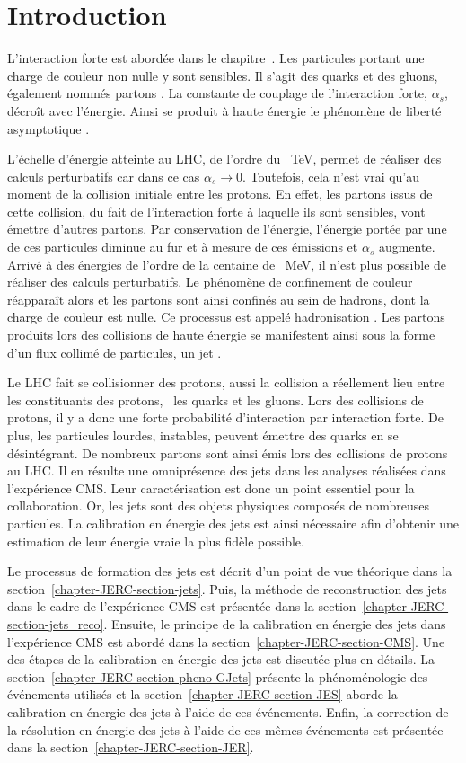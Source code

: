 \section{Introduction}\label{chapter-JERC-section-introduction}
L'interaction forte est abordée dans le chapitre~.
Les particules portant une charge de couleur non nulle y sont sensibles.
Il s'agit des quarks et des gluons, également nommés \og partons \fg.
La constante de couplage de l'interaction forte, $\alpha_s$, décroît  avec l'énergie.
Ainsi se produit à haute énergie le phénomène de \og liberté asymptotique \fg.
\par L'échelle d'énergie atteinte au LHC, de l'ordre du \SI{}{\TeV}, permet de réaliser des calculs perturbatifs car dans ce cas $\alpha_s \to 0$. Toutefois, cela n'est vrai qu'au moment de la collision initiale entre les protons.
En effet, les partons issus de cette collision, du fait de l'interaction forte à laquelle ils sont sensibles, vont émettre d'autres partons.
Par conservation de l'énergie, l'énergie portée par une de ces particules diminue au fur et à mesure de ces émissions et $\alpha_s$ augmente.
Arrivé à des énergies de l'ordre de la centaine de \SI{}{\MeV}, il n'est plus possible de réaliser des calculs perturbatifs.
Le phénomène de confinement de couleur réapparaît alors et les partons sont ainsi confinés au sein de hadrons, dont la charge de couleur est nulle.
Ce processus est appelé \og hadronisation \fg.
Les partons produits lors des collisions de haute énergie se manifestent ainsi sous la forme d'un flux collimé de particules, un \og jet \fg.
\par Le LHC fait se collisionner des protons, aussi la collision a réellement lieu entre les constituants des protons, \ie\ les quarks et les gluons.
Lors des collisions de protons, il y a donc une forte probabilité d'interaction par interaction forte.
De plus, les particules lourdes, instables, peuvent émettre des quarks en se désintégrant.
De nombreux partons sont ainsi émis lors des collisions de protons au LHC.
Il en résulte une omniprésence des jets dans les analyses réalisées dans l'expérience CMS.
Leur caractérisation est donc un point essentiel pour la collaboration.
Or, les jets sont des objets physiques composés de nombreuses particules.
La calibration en énergie des jets est ainsi nécessaire afin d'obtenir une estimation de leur énergie \og vraie \fg{} la plus fidèle possible.
\par Le processus de formation des jets est décrit d'un point de vue théorique dans la section~\ref{chapter-JERC-section-jets}.
Puis, la méthode de reconstruction des jets dans le cadre de l'expérience CMS est présentée dans la section~\ref{chapter-JERC-section-jets_reco}.
Ensuite, le principe de la calibration en énergie des jets dans l'expérience CMS est abordé dans la section~\ref{chapter-JERC-section-CMS}.
Une des étapes de la calibration en énergie des jets est discutée plus en détails.
La section~\ref{chapter-JERC-section-pheno-GJets} présente la phénoménologie des événements utilisés et la section~\ref{chapter-JERC-section-JES} aborde la calibration en énergie des jets à l'aide de ces événements.
Enfin, la correction de la résolution en énergie des jets à l'aide de ces mêmes événements est présentée dans la section~\ref{chapter-JERC-section-JER}.
